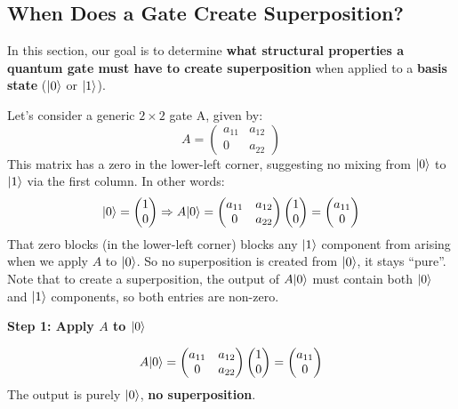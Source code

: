 \subsection{When Does a Gate Create Superposition?}

In this section, our goal is to determine \textbf{what structural properties a quantum gate must have to create superposition} when applied to a \textbf{basis state} ($| 0 \rangle$ or $| 1 \rangle$).

\highspace
Let's consider a generic $2 \times 2$ gate A, given by:
\begin{equation*}
    A =
    \begin{pmatrix}
        a_{11} & a_{12} \\ 0 & a_{22}
    \end{pmatrix}
\end{equation*}
This matrix has a zero in the lower-left corner, suggesting no mixing from $| 0 \rangle$ to $| 1 \rangle$ via the first column. In other words:
\begin{equation*}
    | 0 \rangle
    =
    \begin{pmatrix}
        1 \\ 0
    \end{pmatrix}
    \Rightarrow
    A| 0 \rangle
    =
    \begin{pmatrix}
        a_{11} & a_{12} \\ 0 & a_{22}
    \end{pmatrix}
    \begin{pmatrix}
        1 \\ 0
    \end{pmatrix}
    =
    \begin{pmatrix}
        a_{11} \\ 0
    \end{pmatrix}
\end{equation*}
That zero blocks (in the lower-left corner) blocks any $| 1 \rangle$ component from arising when we apply $A$ to $| 0 \rangle$. So no superposition is created from $| 0 \rangle$, it stays ``pure''. Note that to create a superposition, the output of $A| 0 \rangle$ must contain both $| 0 \rangle$ and $| 1 \rangle$ components, so both entries are non-zero.

\highspace
\begin{flushleft}
    \textcolor{Green3}{\textbf{Step 1: Apply $A$ to $| 0 \rangle$}}
\end{flushleft}
\begin{equation*}
    A| 0 \rangle
    =
    \begin{pmatrix}
        a_{11} & a_{12} \\ 0 & a_{22}
    \end{pmatrix}
    \begin{pmatrix}
        1 \\ 0
    \end{pmatrix}
    =
    \begin{pmatrix}
        a_{11} \\ 0
    \end{pmatrix}
\end{equation*}
The output is purely $| 0 \rangle$, \textbf{no superposition}.

